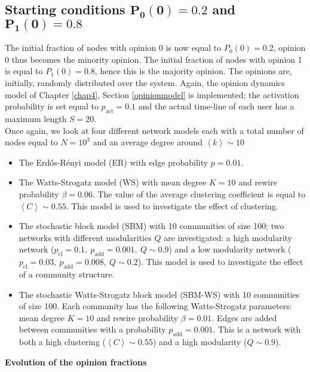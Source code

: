 \documentclass[11 pt , letterpaper , twoside , openright]{book}
\begin{document}
\subsection{Starting conditions $\bm{P_0(0) = 0.2}$ and $\bm{P_1(0)=0.8}$}\label{20-80}

The initial fraction of nodes with opinion 0 is now equal to $P_0(0) = 0.2$, opinion 0 thus becomes the minority opinion. The initial fraction of nodes with opinion 1 is equal to $P_1(0) = 0.8$, hence this is the majority opinion. The opinions are, initially, randomly distributed over the system. Again, the opinion dynamics model of Chapter \ref{chap4}, Section \ref{opinionmodel} is implemented; the activation probability is set equal to $p_{\text{act}} = 0.1$ and the actual time-line of each user has a maximum length $S = 20$.\\
\newline
Once again, we look at four different network models each with a total number of nodes equal to $N = 10^3$ and an average degree around $\left<k\right> \sim 10$
\begin{itemize}
	\item The Erd\H{o}s-R\'{e}nyi model (ER) with edge probability $p = 0.01$.
	\item The Watts-Strogatz model (WS) with mean degree $K=10$ and rewire probability $\beta = 0.06$. The value of the average clustering coefficient is equal to $\left<C\right> \sim 0.55$. This model is used to investigate the effect of clustering.
	\newpage
	\item The stochastic block model (SBM) with 10 communities of size 100; two networks with different modularities $Q$ are investigated: a high modularity network ($p_{\text{cl}} = 0.1,\ p_{\text{add}} = 0.001,\ Q \sim 0.9$) and a low modularity network ($p_{\text{cl}} = 0.03,\ p_{\text{add}} = 0.008,\ Q \sim 0.2$). This model is used to investigate the effect of a community structure.
	\item The stochastic Watts-Strogatz block model (SBM-WS) with 10 communities of size 100. Each community has the following Watts-Strogatz parameters: mean degree $K =10$ and rewire probability $\beta = 0.01$. Edges are added between communities with a probability $p_{\text{add}} = 0.001$. This is a network with both a high clustering ($\left<C\right> \sim 0.55$) and a high modularity ($Q \sim 0.9$).
\end{itemize}
\textbf{Evolution of the opinion fractions}\\
\newline
\end{document}
